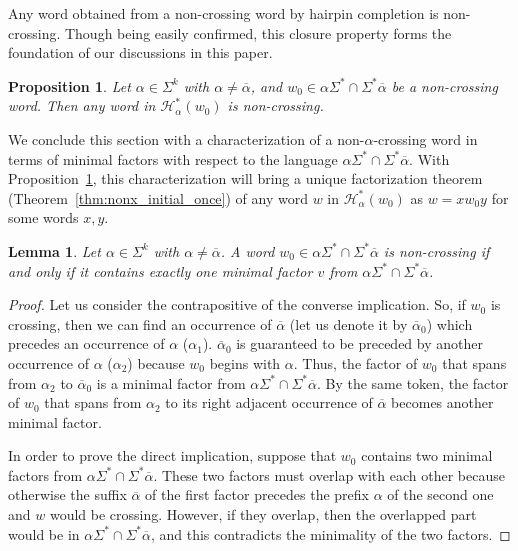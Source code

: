 \documentclass{article}
\theoremstyle{plain}
\newtheorem{lemma}{Lemma}
\newtheorem{proposition}{Proposition}
\theoremstyle{remark}
\newcommand{\HC}{\ensuremath{\mathcal{H}}}
\newcommand{\calpha}{\ensuremath{\overline{\alpha}}}
\begin{document}
Any word obtained from a non-crossing word by hairpin completion is non-crossing. 
Though being easily confirmed, this closure property forms the foundation of our discussions in this paper. 

\begin{proposition}\label{prop:nonx_HC}
	Let $\alpha \in \Sigma^k$ with $\alpha \neq \overline{\alpha}$, and $w_0 \in \alpha \Sigma^* \cap \Sigma^* \overline{\alpha}$ be a non-crossing word. 
	Then any word in $\HC_\alpha^*(w_0)$ is non-crossing. 
\end{proposition}

We conclude this section with a characterization of a non-$\alpha$-crossing word in terms of minimal factors with respect to the language $\alpha \Sigma^* \cap \Sigma^* \calpha$. 
With Proposition~\ref{prop:nonx_HC}, this characterization will bring a unique factorization theorem (Theorem~\ref{thm:nonx_initial_once}) of any word $w$ in $\HC_\alpha^*(w_0)$ as $w = xw_0y$ for some words $x, y$. 

\begin{lemma}
	Let $\alpha \in \Sigma^k$ with $\alpha \neq \calpha$. 
	A word $w_0 \in \alpha\Sigma^* \cap \Sigma^*\calpha$ is non-crossing if and only if it contains exactly one minimal factor $v$ from $\alpha\Sigma^* \cap \Sigma^*\overline\alpha$.
\end{lemma}
\begin{proof}
	Let us consider the contrapositive of the converse implication. 
	So, if $w_0$ is crossing, then we can find an occurrence of $\calpha$ (let us denote it by $\calpha_0$) which precedes an occurrence of $\alpha$ ($\alpha_1$). 
	$\calpha_0$ is guaranteed to be preceded by another occurrence of $\alpha$ ($\alpha_2$) because $w_0$ begins with $\alpha$. 
	Thus, the factor of $w_0$ that spans from $\alpha_2$ to $\calpha_0$ is a minimal factor from $\alpha \Sigma^* \cap \Sigma^* \calpha$. 
	By the same token, the factor of $w_0$ that spans from $\alpha_2$ to its right adjacent occurrence of $\calpha$ becomes another minimal factor. 

	In order to prove the direct implication, suppose that $w_0$ contains two minimal factors from $\alpha \Sigma^* \cap \Sigma^* \calpha$. 
	These two factors must overlap with each other because otherwise the suffix $\calpha$ of the first factor precedes the prefix $\alpha$ of the second one and $w$ would be crossing. 
	However, if they overlap, then the overlapped part would be in $\alpha \Sigma^* \cap \Sigma^* \calpha$, and this contradicts the minimality of the two factors. 
\end{proof}
\end{document}
